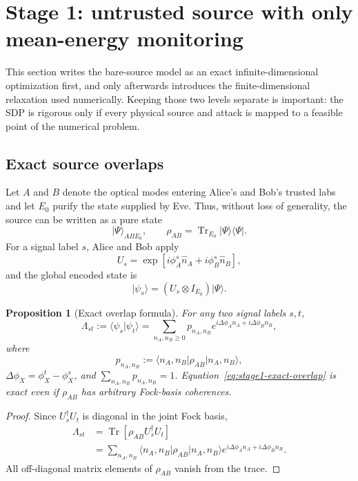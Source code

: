 \documentclass[11pt]{article}
\newtheorem{proposition}{Proposition}
\theoremstyle{remark}
\begin{document}
\section{Stage 1: untrusted source with only mean-energy monitoring}
\label{sec:stage1-rigorous}

This section writes the bare-source model as an exact infinite-dimensional
optimization first, and only afterwards introduces the finite-dimensional
relaxation used numerically. Keeping those two levels separate is important:
the SDP is rigorous only if every physical source and attack is mapped to a
feasible point of the numerical problem.

\subsection{Exact source overlaps}

Let \(A\) and \(B\) denote the optical modes entering Alice's and Bob's
trusted labs and let \(E_0\) purify the state supplied by Eve. Thus, without
loss of generality, the source can be written as a pure state
\[
    \lvert\Psi\rangle_{ABE_0},
    \qquad
    \rho_{AB}=\operatorname{Tr}_{E_0}\lvert\Psi\rangle\!\langle\Psi\rvert.
\]
For a signal label \(s\), Alice and Bob apply
\[
    U_s
    =
    \exp\!\left[
      i\phi_A^s \hat n_A+i\phi_B^s\hat n_B
    \right],
\]
and the global encoded state is
\[
    \lvert\psi_s\rangle
    =
    (U_s\otimes I_{E_0})\lvert\Psi\rangle.
\]

\begin{proposition}[Exact overlap formula]
For any two signal labels \(s,t\),
\begin{equation}
    \Lambda_{st}
    :=
    \langle\psi_s\vert\psi_t\rangle
    =
    \sum_{n_A,n_B\ge0}
      p_{n_A,n_B}
      e^{i\Delta\phi_A n_A+i\Delta\phi_B n_B},
    \label{eq:stage1-exact-overlap}
\end{equation}
where
\[
    p_{n_A,n_B}
    :=
    \langle n_A,n_B\vert\rho_{AB}\vert n_A,n_B\rangle,
\]
\(\Delta\phi_X=\phi_X^t-\phi_X^s\), and
\(\sum_{n_A,n_B}p_{n_A,n_B}=1\).
Equation~\eqref{eq:stage1-exact-overlap} is exact even if
\(\rho_{AB}\) has arbitrary Fock-basis coherences.
\end{proposition}

\begin{proof}
Since \(U_s^\dagger U_t\) is diagonal in the joint Fock basis,
\begin{align}
    \Lambda_{st}
    &=
    \operatorname{Tr}
    \left[
      \rho_{AB}U_s^\dagger U_t
    \right] \\
    &=
    \sum_{n_A,n_B}
    \langle n_A,n_B\vert\rho_{AB}\vert n_A,n_B\rangle
    e^{i\Delta\phi_A n_A+i\Delta\phi_B n_B}.
\end{align}
All off-diagonal matrix elements of \(\rho_{AB}\) vanish from the trace.
\end{proof}
\end{document}
